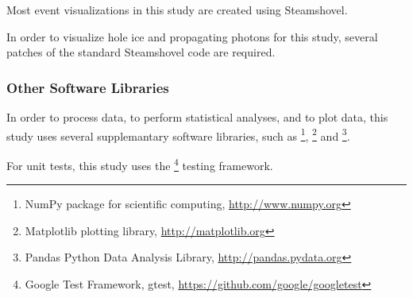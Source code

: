 Most event visualizations in this study are created using Steamshovel.

In order to visualize hole ice and propagating photons for this study, several patches of the standard Steamshovel code are required.



\subsubsection{Other Software Libraries}

In order to process data, to perform statistical analyses, and to plot data, this study uses several supplemantary software libraries, such as \footnote{NumPy package for scientific computing, \url{http://www.numpy.org}}, \footnote{Matplotlib plotting library, \url{http://matplotlib.org}} and \footnote{Pandas Python Data Analysis Library, \url{http://pandas.pydata.org}}.


For unit tests, this study uses the \footnote{Google Test Framework, gtest, \url{https://github.com/google/googletest}} testing framework.

